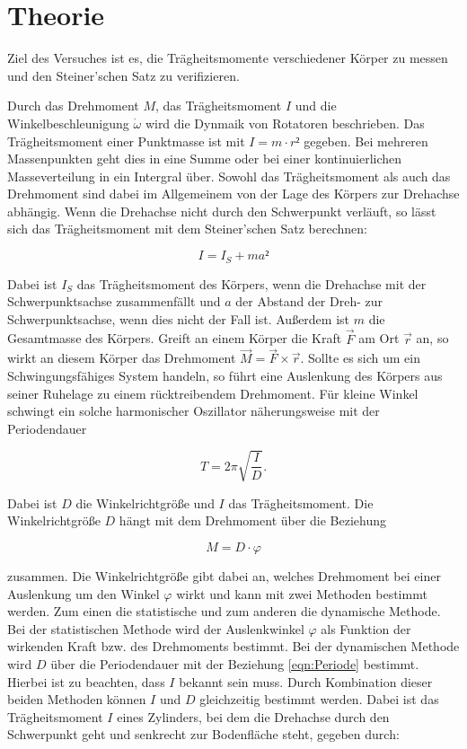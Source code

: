 \section{Theorie}
\label{sec:Theorie}

Ziel des Versuches ist es, die Trägheitsmomente verschiedener Körper 
zu messen und den Steiner'schen Satz zu verifizieren.

Durch das Drehmoment $M$, das Trägheitsmoment $I$ und die Winkelbeschleunigung 
$\dot\omega$ wird die Dynmaik von Rotatoren beschrieben. Das Trägheitsmoment
einer Punktmasse ist mit $I = m\cdot r²$ gegeben. Bei mehreren Massenpunkten
geht dies in eine Summe oder bei einer kontinuierlichen Masseverteilung 
in ein Intergral über. Sowohl das Trägheitsmoment als auch das Drehmoment 
sind dabei im Allgemeinem von der Lage des Körpers zur Drehachse abhängig. 
Wenn die Drehachse nicht durch den Schwerpunkt verläuft, so lässt sich das
Trägheitsmoment mit dem Steiner'schen Satz berechnen: 

\begin{equation}
I = I_S + ma² 
\label{Steiner}
\end{equation}

Dabei ist $I_S$ das Trägheitsmoment des Körpers, wenn die Drehachse mit der 
Schwerpunktsachse zusammenfällt und $a$ der Abstand der Dreh- zur Schwerpunktsachse, 
wenn dies nicht der Fall ist. Außerdem ist $m$ die Gesamtmasse des Körpers.
Greift an einem Körper die Kraft $\vec{F}$ am Ort $\vec{r}$ an, so wirkt 
an diesem Körper das Drehmoment $\vec{M} = \vec{F} \times \vec{r}$. Sollte es
sich um ein Schwingungsfähiges System handeln, so führt eine Auslenkung des 
Körpers aus seiner Ruhelage zu einem rücktreibendem Drehmoment. Für kleine
Winkel schwingt ein solche harmonischer Oszillator näherungsweise mit 
der Periodendauer

\begin{equation}
T = 2\pi\sqrt{\frac{I}{D}}.
\label{eqn:Periode}
\end{equation}

Dabei ist $D$ die Winkelrichtgröße und $I$ das Trägheitsmoment. Die 
Winkelrichtgröße $D$ hängt mit dem Drehmoment über die Beziehung 

\begin{equation}
M = D\cdot\varphi
\end{equation}

zusammen. Die Winkelrichtgröße gibt dabei an, welches Drehmoment bei einer 
Auslenkung um den Winkel $\varphi$ wirkt und kann mit zwei Methoden bestimmt 
werden. Zum einen die statistische und zum anderen die dynamische Methode. 
Bei der statistischen Methode wird der Auslenkwinkel $\varphi$ als Funktion
der wirkenden Kraft bzw. des Drehmoments bestimmt. Bei der dynamischen 
Methode wird $D$ über die Periodendauer mit der Beziehung \eqref{eqn:Periode}
bestimmt. Hierbei ist zu beachten, dass $I$ bekannt sein muss. 
Durch Kombination dieser beiden Methoden können $I$ und $D$ gleichzeitig
bestimmt werden. 
Dabei ist das Trägheitsmoment $I$ eines Zylinders, bei dem die Drehachse
durch den Schwerpunkt geht und senkrecht zur Bodenfläche steht, gegeben 
durch: 

